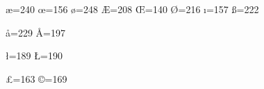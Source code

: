 


\chardef\ae=240	%
\chardef\oe=156 %
\chardef\o=248  %
\chardef\AE=208	%
\chardef\OE=140 %
\chardef\O=216  %
\chardef\i=157  %
\chardef\ss=222	%


\chardef\aa=229 \chardef\AA=197 %
\chardef{} \chardef{} %

\chardef\l=189 \chardef\L=190	%

\chardef\pounds=163 \chardef\copyright=169



\def\`#1{{\accent96 #1}}	%
\def\'#1{{\accent180 #1}}	%
\def\v#1{{\accent141 #1}}	%
\def\u#1{{\accent198 #1}}	%
\def\=#1{{\accent175 #1}}	%
\def\^#1{{\accent136 #1}}	%
\def\.#1{{\accent199 #1}}	%
\def\H#1{{\accent205 #1}}	%
\def\~#1{{\accent152 #1}}	%
\def\"#1{{\accent168 #1}}	%




\def\b#1{\oalign{#1\crcr\hidewidth
    \vbox to.2ex{\hbox{\char175}\vss}\hidewidth}}
\def\c#1{\setbox0\hbox{#1}\ifdim\ht0=1ex\accent184 #1%
  \else{\ooalign{\hidewidth\char184\hidewidth\crcr\unhbox0}}\fi}

